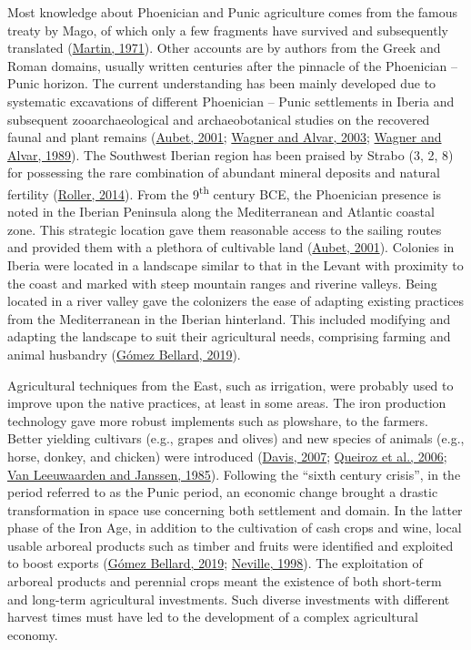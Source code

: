 \documentclass[preprint, 3p, authoryear]{elsarticle} %
\begin{document}
Most knowledge about Phoenician and Punic agriculture comes from the famous treaty by Mago, of which only a few fragments have survived and subsequently translated (\protect\hyperlink{ref-martin71}{Martin, 1971}). Other accounts are by authors from the Greek and Roman domains, usually written centuries after the pinnacle of the Phoenician -- Punic horizon. The current understanding has been mainly developed due to systematic excavations of different Phoenician -- Punic settlements in Iberia and subsequent zooarchaeological and archaeobotanical studies on the recovered faunal and plant remains (\protect\hyperlink{ref-aubet01}{Aubet, 2001}; \protect\hyperlink{ref-wagner_alvar03}{Wagner and Alvar, 2003}; \protect\hyperlink{ref-wagner_alvar89}{Wagner and Alvar, 1989}). The Southwest Iberian region has been praised by Strabo (3, 2, 8) for possessing the rare combination of abundant mineral deposits and natural fertility (\protect\hyperlink{ref-roller14}{Roller, 2014}). From the 9\textsuperscript{th} century BCE, the Phoenician presence is noted in the Iberian Peninsula along the Mediterranean and Atlantic coastal zone. This strategic location gave them reasonable access to the sailing routes and provided them with a plethora of cultivable land (\protect\hyperlink{ref-aubet01}{Aubet, 2001}). Colonies in Iberia were located in a landscape similar to that in the Levant with proximity to the coast and marked with steep mountain ranges and riverine valleys. Being located in a river valley gave the colonizers the ease of adapting existing practices from the Mediterranean in the Iberian hinterland. This included modifying and adapting the landscape to suit their agricultural needs, comprising farming and animal husbandry (\protect\hyperlink{ref-gomezbellard19}{Gómez Bellard, 2019}).

Agricultural techniques from the East, such as irrigation, were probably used to improve upon the native practices, at least in some areas. The iron production technology gave more robust implements such as plowshare, to the farmers. Better yielding cultivars (e.g., grapes and olives) and new species of animals (e.g., horse, donkey, and chicken) were introduced (\protect\hyperlink{ref-davis07}{Davis, 2007}; \protect\hyperlink{ref-queiroz_etal06}{Queiroz et al., 2006}; \protect\hyperlink{ref-vanleeuwaarden_janssen85}{Van Leeuwaarden and Janssen, 1985}). Following the ``sixth century crisis'', in the period referred to as the Punic period, an economic change brought a drastic transformation in space use concerning both settlement and domain. In the latter phase of the Iron Age, in addition to the cultivation of cash crops and wine, local usable arboreal products such as timber and fruits were identified and exploited to boost exports (\protect\hyperlink{ref-gomezbellard19}{Gómez Bellard, 2019}; \protect\hyperlink{ref-neville98}{Neville, 1998}). The exploitation of arboreal products and perennial crops meant the existence of both short-term and long-term agricultural investments. Such diverse investments with different harvest times must have led to the development of a complex agricultural economy.
\end{document}
